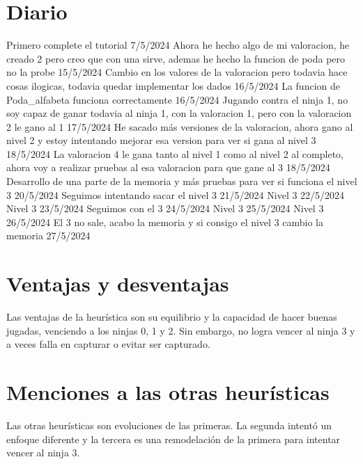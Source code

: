 \documentclass[a4paper, 11pt]{article}
\begin{document}
\section{Diario}

Primero complete el tutorial 7/5/2024
Ahora he hecho algo de mi valoracion, he creado 2 pero creo que con una sirve, ademas he hecho la funcion de poda pero no la probe 15/5/2024
Cambio en los valores de la valoracion pero todavia hace cosas ilogicas, todavia quedar implementar los dados 16/5/2024
La funcion de Poda\_alfabeta funciona correctamente 16/5/2024
Jugando contra el ninja 1, no soy capaz de ganar todavia al ninja 1, con la valoracion 1, pero con la valoracion 2 le gano al 1 17/5/2024
He sacado más versiones de la valoracion, ahora gano al nivel 2 y estoy intentando mejorar esa version para ver si gana al nivel 3 18/5/2024
La valoracion 4 le gana tanto al nivel 1 como al nivel 2 al completo, ahora voy a realizar pruebas al esa valoracion para que gane al 3 18/5/2024
Desarrollo de una parte de la memoria y más pruebas para ver si funciona el nivel 3 20/5/2024
Seguimos intentando sacar el nivel 3 21/5/2024
Nivel 3 22/5/2024
Nivel 3 23/5/2024
Seguimos con el 3 24/5/2024
Nivel 3 25/5/2024
Nivel 3 26/5/2024
El 3 no sale, acabo la memoria y si consigo el nivel 3 cambio la memoria 27/5/2024

\section{Ventajas y desventajas}

Las ventajas de la heurística son su equilibrio y la capacidad de hacer buenas jugadas, venciendo a los ninjas 0, 1 y 2. Sin embargo, no logra vencer al ninja 3 y a veces falla en capturar o evitar ser capturado.

\section{Menciones a las otras heurísticas}

Las otras heurísticas son evoluciones de las primeras. La segunda intentó un enfoque diferente y la tercera es una remodelación de la primera para intentar vencer al ninja 3.
\end{document}
